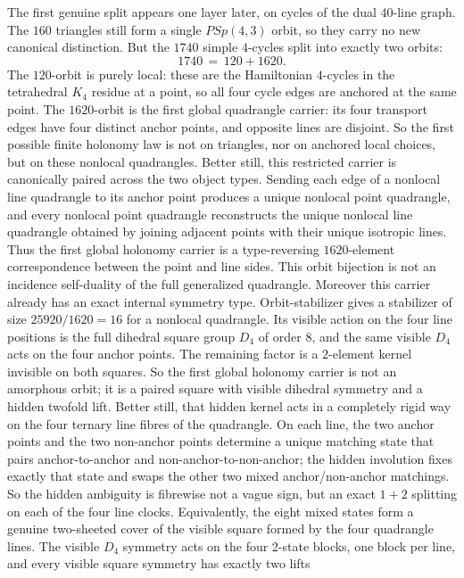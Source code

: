 \documentclass[12pt,a4paper]{article}
\def\mathrm#1{#1}%
\theoremstyle{definition}
\newcommand{\PSp}{\mathrm{PSp}}
\begin{document}
The first genuine split appears one layer later, on cycles of the dual
40-line graph.  The $160$ triangles still form a single
$\PSp(4,3)$ orbit, so they carry no new canonical distinction.  But the
$1740$ simple $4$-cycles split into exactly two orbits:
\[
1740 \,=\, 120 + 1620.
\]
The $120$-orbit is purely local: these are the Hamiltonian $4$-cycles in
the tetrahedral $K_4$ residue at a point, so all four cycle edges are
anchored at the same point.  The $1620$-orbit is the first global
quadrangle carrier: its four transport edges have four distinct anchor
points, and opposite lines are disjoint.  So the first possible finite
holonomy law is not on triangles, nor on anchored local choices, but on
these nonlocal quadrangles.  Better still, this restricted carrier is
canonically paired across the two object types.  Sending each edge of a
nonlocal line quadrangle to its
anchor point produces a unique nonlocal point quadrangle, and every
nonlocal point quadrangle reconstructs the unique nonlocal line
quadrangle obtained by joining adjacent points with their unique
isotropic lines.  Thus the first global holonomy carrier is a
type-reversing $1620$-element correspondence between the point and line
sides.  This orbit bijection is not an incidence self-duality of the full
generalized quadrangle.  Moreover this carrier already has an exact
internal symmetry type.  Orbit-stabilizer gives a stabilizer of size
$25920/1620=16$ for a nonlocal quadrangle.  Its visible action on the
four line positions is the full dihedral square group $D_4$ of order
$8$, and the same visible $D_4$ acts on the four anchor points.  The
remaining factor is a $2$-element kernel invisible on both squares.  So
the first global holonomy carrier is not an amorphous orbit; it is a
paired square with visible dihedral symmetry and a hidden twofold
lift.  Better still, that hidden kernel acts in a completely rigid way
on the four ternary line fibres of the quadrangle.  On each line, the
two anchor points and the two non-anchor points determine a unique
matching state that pairs anchor-to-anchor and non-anchor-to-non-anchor;
the hidden involution fixes exactly that state and swaps the other two
mixed anchor/non-anchor matchings.  So the hidden ambiguity is fibrewise
not a vague sign, but an exact $1{+}2$ splitting on each of the four
line clocks.  Equivalently, the eight mixed states form a genuine
two-sheeted cover of the visible square formed by the four quadrangle
lines.  The visible $D_4$ symmetry acts on the four 2-state blocks, one
block per line, and every visible square symmetry has exactly two lifts
\end{document}
